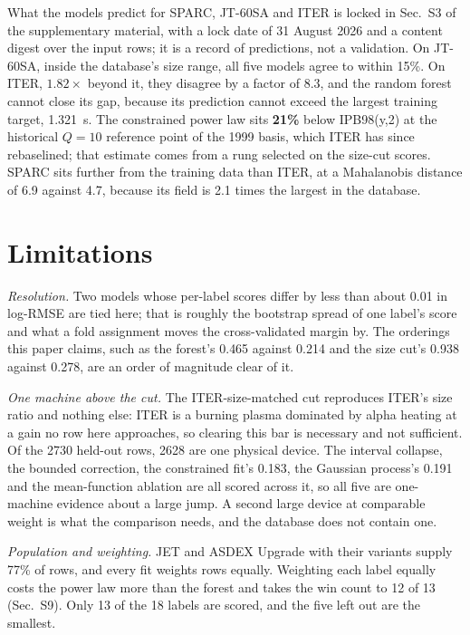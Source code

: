\documentclass[aip,pop,preprint,amsmath,amssymb]{revtex4-2}
\begin{document}
What the models predict for SPARC, JT-60SA and ITER is locked in Sec.~S3 of
the supplementary material, with a lock date of 31 August 2026 and a content
digest over the input rows; it is a record of predictions, not a validation.
On JT-60SA, inside the database's size range, all five models agree to within
15\%. On ITER, $1.82\times$ beyond it, they disagree by a factor of 8.3, and
the random forest cannot close its gap, because its prediction cannot exceed
the largest training target, \SI{1.321}{\second}. The constrained power law
sits \textbf{21\%} below IPB98(y,2) at the historical $Q=10$ reference point of
the 1999 basis\cite{ipb98}, which ITER has since rebaselined\cite{loarte};
that estimate comes from a rung selected on the size-cut scores. SPARC sits
further from the training data than ITER, at a Mahalanobis distance of 6.9
against 4.7, because its field is 2.1 times the largest in the database.

\section{Limitations}
\label{sec:limitations}

\emph{Resolution.} Two models whose per-label scores differ by less than about
0.01 in log-RMSE are tied here; that is roughly the bootstrap spread of one
label's score and what a fold assignment moves the cross-validated margin by.
The orderings this paper claims, such as the forest's 0.465 against 0.214 and
the size cut's 0.938 against 0.278, are an order of magnitude clear of it.

\emph{One machine above the cut.} The ITER-size-matched cut reproduces ITER's
size ratio and nothing else: ITER is a burning plasma dominated by alpha
heating at a gain no row here approaches, so clearing this bar is necessary and
not sufficient. Of the 2730 held-out rows, 2628 are one physical device. The
interval collapse, the bounded correction, the constrained fit's 0.183, the
Gaussian process's 0.191 and the mean-function ablation are all scored across
it, so all five are one-machine evidence about a large jump. A second large
device at comparable weight is what the comparison needs, and the database does
not contain one.

\emph{Population and weighting.} JET and ASDEX Upgrade with their variants
supply 77\% of rows, and every fit weights rows equally. Weighting each label
equally costs the power law more than the forest and takes the win count to 12
of 13 (Sec.~S9). Only 13 of the 18 labels are scored, and the five left out are
the smallest.
\end{document}
